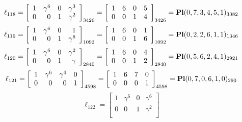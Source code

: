 \documentclass{article}
\begin{document}
{$$
\ell_{118} = 
\left[
\begin{array}{*{4}{r}}
1 & \gamma^{6} & 0 & \gamma^{3}\\
0 & 0 & 1 & \gamma^{2}\\
\end{array}
\right]
_{3426}
=
\left[
\begin{array}{*{4}c}
1  & 6  & 0  & 5\\
0  & 0  & 1  & 4\\
\end{array}
\right]_{3426}
={\rm\bf Pl}(0,7,3,4,5,1 )_{3382}$$
$$
\ell_{119} = 
\left[
\begin{array}{*{4}{r}}
1 & \gamma^{6} & 0 & 1\\
0 & 0 & 1 & \gamma^{6}\\
\end{array}
\right]
_{1092}
=
\left[
\begin{array}{*{4}c}
1  & 6  & 0  & 1\\
0  & 0  & 1  & 6\\
\end{array}
\right]_{1092}
={\rm\bf Pl}(0,2,2,6,1,1 )_{1346}$$
$$
\ell_{120} = 
\left[
\begin{array}{*{4}{r}}
1 & \gamma^{6} & 0 & \gamma^{2}\\
0 & 0 & 1 & \gamma \\
\end{array}
\right]
_{2840}
=
\left[
\begin{array}{*{4}c}
1  & 6  & 0  & 4\\
0  & 0  & 1  & 2\\
\end{array}
\right]_{2840}
={\rm\bf Pl}(0,5,6,2,4,1 )_{2921}$$
$$
\ell_{121} = 
\left[
\begin{array}{*{4}{r}}
1 & \gamma^{6} & \gamma^{4} & 0\\
0 & 0 & 0 & 1\\
\end{array}
\right]
_{4598}
=
\left[
\begin{array}{*{4}c}
1  & 6  & 7  & 0\\
0  & 0  & 0  & 1\\
\end{array}
\right]_{4598}
={\rm\bf Pl}(0,7,0,6,1,0 )_{290}$$
$$
\ell_{122} = 
\left[
\begin{array}{*{4}{r}}
1 & \gamma^{6} & 0 & \gamma^{6}\\
0 & 0 & 1 & \gamma^{2}\\
\end{array}
\right]
$$}
\end{document}
